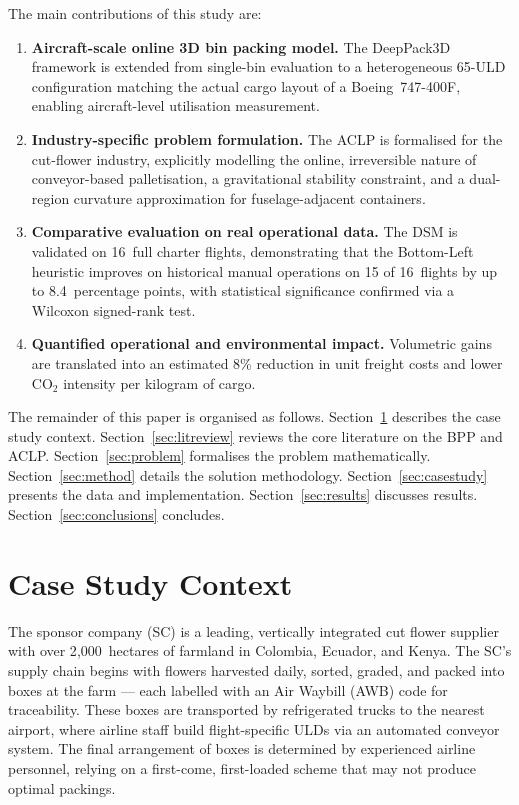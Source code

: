 \documentclass[12pt,a4paper]{article}
\begin{document}
\medskip\noindent
The main contributions of this study are:
\begin{enumerate}
  \item \textbf{Aircraft-scale online 3D bin packing model.}
        The DeepPack3D framework \citep{Tsang2025} is extended from
        single-bin evaluation to a heterogeneous 65-ULD configuration
        matching the actual cargo layout of a Boeing~747-400F, enabling
        aircraft-level utilisation measurement.

  \item \textbf{Industry-specific problem formulation.}
        The ACLP is formalised for the cut-flower industry, explicitly
        modelling the online, irreversible nature of conveyor-based
        palletisation, a gravitational stability constraint, and a
        dual-region curvature approximation for fuselage-adjacent
        containers.

  \item \textbf{Comparative evaluation on real operational data.}
        The DSM is validated on 16~full charter flights, demonstrating
        that the Bottom-Left heuristic improves on historical manual
        operations on 15 of 16~flights by up to 8.4~percentage points,
        with statistical significance confirmed via a Wilcoxon
        signed-rank test.

  \item \textbf{Quantified operational and environmental impact.}
        Volumetric gains are translated into an estimated 8\% reduction
        in unit freight costs and lower CO$_2$ intensity per kilogram
        of cargo.
\end{enumerate}

The remainder of this paper is organised as follows.
Section~\ref{sec:context} describes the case study context.
Section~\ref{sec:litreview} reviews the core literature on the BPP and
ACLP.
Section~\ref{sec:problem} formalises the problem mathematically.
Section~\ref{sec:method} details the solution methodology.
Section~\ref{sec:casestudy} presents the data and implementation.
Section~\ref{sec:results} discusses results.
Section~\ref{sec:conclusions} concludes.


\section{Case Study Context}
\label{sec:context}

The sponsor company (SC) is a leading, vertically integrated cut flower
supplier with over 2{,}000~hectares of farmland in Colombia, Ecuador,
and Kenya.
The SC's supply chain begins with flowers harvested daily, sorted,
graded, and packed into boxes at the farm --- each labelled with an Air
Waybill (AWB) code for traceability.
These boxes are transported by refrigerated trucks to the nearest
airport, where airline staff build flight-specific ULDs via an
automated conveyor system.
The final arrangement of boxes is determined by experienced airline
personnel, relying on a first-come, first-loaded scheme that may not
produce optimal packings.
\end{document}
